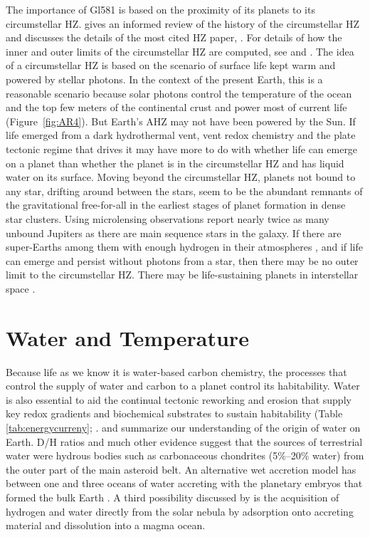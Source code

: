 The importance of Gl581 is based on the proximity of its planets to its circumstellar HZ. \citet[][ch 10]{Kasting2012} gives an informed review of the history of the circumstellar HZ and discusses the details of the most cited HZ paper, \citet{Kasting1993}. For details of how the inner and outer limits of the circumstellar HZ are computed, see \citet{Forget1997} and \citet{Abe2011}. The idea of a circumstellar HZ is based on the scenario of surface life kept warm and powered by stellar photons. In the context of the present Earth, this is a reasonable scenario because solar photons control the temperature of the ocean and the top few meters of the continental crust and power most of current life (Figure~\ref{fig:AR4}). But Earth's AHZ may not have been powered by the Sun. If life emerged from a dark hydrothermal vent, vent redox chemistry and the plate tectonic regime that drives it may have more to do with whether life can emerge on a planet than whether the planet is in the circumstellar HZ and has liquid water on its surface. Moving beyond the circumstellar HZ, planets not bound to any star, drifting around between the stars, seem to be the abundant remnants of the gravitational free-for-all in the earliest stages of planet formation in dense star clusters. Using microlensing observations \citet{Sumi2011} report nearly twice as many unbound Jupiters as there are main sequence stars in the galaxy. If there are super-Earths among them with enough hydrogen in their atmospheres \citep{Pierrehumbert2011}, and if life can emerge and persist without photons from a star, then there may be no outer limit to the circumstellar HZ. There may be life-sustaining planets in interstellar space \citep{Stevenson1999}.

\section{Water and Temperature}\label{sec:WaterDel}
Because life as we know it is water-based carbon chemistry, the processes that control the supply of water and carbon to a planet control its habitability. Water is also essential to aid the continual tectonic reworking and erosion that supply key redox gradients and biochemical substrates to sustain habitability (Table \ref{tab:energycurreny}; \citep{Nisbet2007}. \citep{Morbidelli2000} and \citet{Mottl2007} summarize our understanding of the origin of water on Earth. D/H ratios \citep{Robert2001} and much other evidence suggest that the sources of terrestrial water were hydrous bodies such as carbonaceous chondrites (5\%–20\% water) from the outer part of the main asteroid belt. An alternative wet accretion model has between one and three oceans of water accreting with the planetary embryos that formed the bulk Earth \citep{Drake2002, Drake2005}. A third possibility discussed by \citet{Mottl2007} is the acquisition of hydrogen and water directly from the solar nebula by adsorption onto accreting material and dissolution into a magma ocean.

